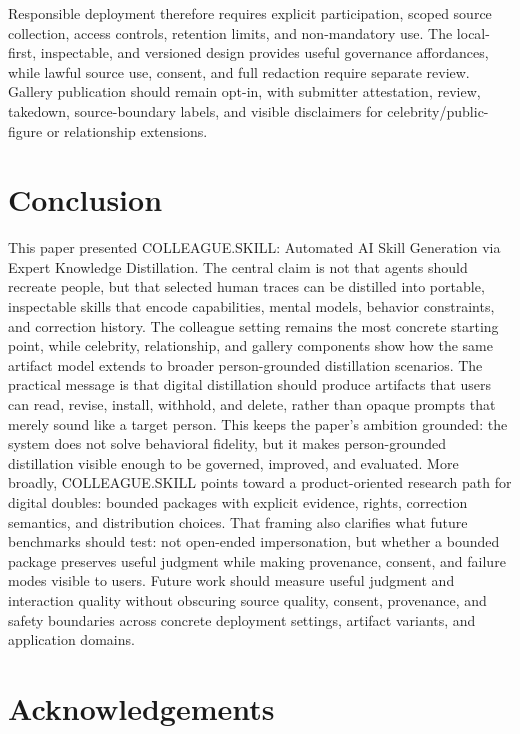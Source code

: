 \documentclass{article}
\newcommand{\system}{\textsc{COLLEAGUE.SKILL}\xspace}
\begin{document}
Responsible deployment therefore requires explicit participation, scoped source collection, access controls, retention limits, and non-mandatory use. The local-first, inspectable, and versioned design provides useful governance affordances, while lawful source use, consent, and full redaction require separate review. Gallery publication should remain opt-in, with submitter attestation, review, takedown, source-boundary labels, and visible disclaimers for celebrity/public-figure or relationship extensions.

\section{Conclusion}

This paper presented \textsc{COLLEAGUE.SKILL}: Automated AI Skill Generation via Expert Knowledge Distillation. The central claim is not that agents should recreate people, but that selected human traces can be distilled into portable, inspectable skills that encode capabilities, mental models, behavior constraints, and correction history. The colleague setting remains the most concrete starting point, while celebrity, relationship, and gallery components show how the same artifact model extends to broader person-grounded distillation scenarios. The practical message is that digital distillation should produce artifacts that users can read, revise, install, withhold, and delete, rather than opaque prompts that merely sound like a target person. This keeps the paper's ambition grounded: the system does not solve behavioral fidelity, but it makes person-grounded distillation visible enough to be governed, improved, and evaluated. More broadly, \system points toward a product-oriented research path for digital doubles: bounded packages with explicit evidence, rights, correction semantics, and distribution choices. That framing also clarifies what future benchmarks should test: not open-ended impersonation, but whether a bounded package preserves useful judgment while making provenance, consent, and failure modes visible to users. Future work should measure useful judgment and interaction quality without obscuring source quality, consent, provenance, and safety boundaries across concrete deployment settings, artifact variants, and application domains.

\clearpage
\section*{Acknowledgements}
\end{document}
